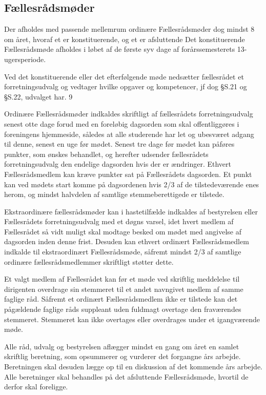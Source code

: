 \begin{list}
\subsection{Fællesrådsmøder}
\item  Der afholdes med passende mellemrum ordinære Fællesrådsmøder dog mindst 8 om året, hvoraf et er
            konstituerende, og et er afsluttende Det konstituerende Fællesrådsmøde afholdes i løbet af de første syv dage
                af forårssemesterets 13-ugersperiode.
\item  Ved det konstituerende eller det efterfølgende møde nedsætter fællesrådet et forretningsudvalg og vedtager
            hvilke opgaver og kompetencer, jf dog §S.21 og §S.22, udvalget har.
9
\item  Ordinære Fællesrådsmøder indkaldes skriftligt af fællesrådets forretningsudvalg senest otte dage forud med
             en foreløbig dagsorden som skal offentliggøres i foreningens hjemmeside, således at alle studerende har let og ubesværet adgang til denne, senest en uge før mødet. Senest
                tre dage før mødet kan påføres punkter, som ønskes behandlet, og herefter udsender fællesrådets
                      forretningsudvalg den endelige dagsorden hvis der er ændringer. Ethvert Fællesrådsmedlem kan kræve
                         punkter sat på Fællesrådets dagsorden.
                           Et punkt kan ved mødets start komme på dagsordenen hvis 2/3 af de tilstedeværende enes herom, og mindst
                             halvdelen af samtlige stemmeberettigede er tilstede.
                             
                             
                             
                             
\item  Ekstraordinære fællesrådsmøder kan i hastetilfælde indkaldes af bestyrelsen eller Fællesrådets
              forretningsudvalg med et døgns varsel, idet hvert medlem af Fællesrådet så vidt muligt skal modtage besked
                 om mødet med angivelse af dagsorden inden denne frist.
                 Desuden kan ethvert ordinært Fællesrådsmedlem indkalde til ekstraordinært Fællesrådsmøde, såfremt mindst
                        2/3 af samtlige ordinære fællesrådsmedlemmer skriftligt støtter dette.
\item  Et valgt medlem af Fællesrådet kan før et møde ved skriftlig meddelelse til dirigenten overdrage sin
           stemmeret til et andet navngivet medlem af samme faglige råd. Såfremt et ordinært Fællesrådsmedlem ikke
               er tilstede kan det pågældende faglige råds suppleant uden fuldmagt overtage den fraværendes stemmeret.
                  Stemmeret kan ikke overtages eller overdrages under et igangværende møde.
\item  Alle råd, udvalg og bestyrelsen aflægger mindst en gang om året en samlet skriftlig beretning, som
          opsummerer og vurderer det forgangne års arbejde. Beretningen skal desuden lægge op til en diskussion af
           det kommende års arbejde. Alle beretninger skal behandles på det afsluttende Fællesrådsmøde, hvortil de
               derfor skal foreligge.

\end{list}
